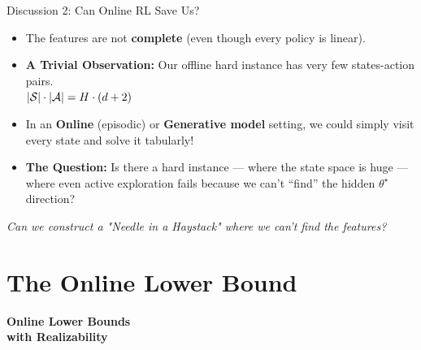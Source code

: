 \documentclass[aspectratio=169]{beamer}
\begin{document}
\begin{frame}{Discussion 2: Can Online RL Save Us?}
  \begin{itemize}
  \item The features are not \textbf{complete} (even though every
    policy is linear).

    \vspace{0.2cm}
    
  \item \textbf{A Trivial Observation:} Our offline hard instance has very few states-action pairs. \\
    $|\mathcal{S}|\cdot|\mathcal{A}|=H \cdot (d+2)$

    \vspace{0.2cm}
    
  \item In an \textbf{Online} (episodic) or \textbf{Generative
      model} setting, we could simply visit every state and
    solve it tabularly! 
        
        \vspace{0.2cm}
        
   
\pause      \item \textbf{The Question:} Is there a hard instance --- where
        the state space is huge --- where even active exploration
        fails because we can't ``find'' the hidden $\theta^\star$ direction?
      \end{itemize}

      \vspace{0.5cm}
      \centering      
\emph{Can we construct a "Needle in a Haystack" where we can't find the features?}
\end{frame}
  


\section{The Online Lower Bound}

\begin{frame}[plain]
  \vfill
  \begin{center}
    {\Huge \bfseries Online Lower Bounds\\ with Realizability}
  \end{center}
  \vfill
\end{frame}
\addtocounter{framenumber}{-1}
\end{document}
